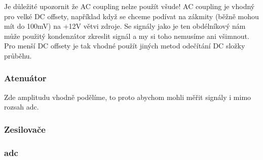 \documentclass[12pt]{article}
\begin{document}
Je důležité upozornit že AC coupling nelze použít všude! AC coupling je vhodný pro velké DC offsety,
například když se chceme podívat na zákmity (běžně mohou mít do 100mV) na +12V větvi zdroje.
Se signály jako je ten obdélníkový nám může použitý kondenzátor zkreslit signál a my si toho
nemusíme ani všimnout. Pro menší DC offsety je tak vhodné použít jiných metod odečítání DC
složky průběhu.

\subsubsection{Atenuátor}

Zde amplitudu vhodně podělíme, to proto abychom mohli měřit signály i mimo rozsah \acrshort{adc}.

\subsubsection{Zesilovače}

\subsubsection{\acrlong{adc}}








\newpage

\printbibliography[
heading=bibintoc,
title={Seznam použité literatury}
]

\newpage

\printglossary[type=\acronymtype, title=Seznam zkratek, toctitle=Seznam zkratek]

\printglossary[title=Slovník pojmů, toctitle=Slovník pojmů]
\end{document}
